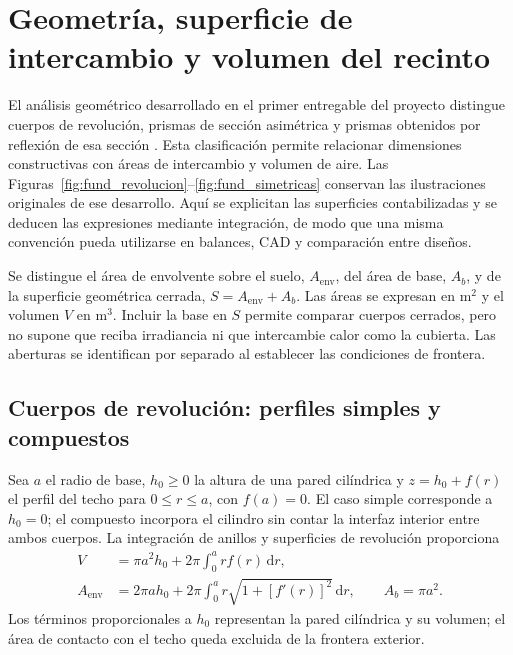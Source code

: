 \section{Geometría, superficie de intercambio y volumen del recinto}
\label{sec:geometria_secadores}

El análisis geométrico desarrollado en el primer entregable del proyecto distingue cuerpos de revolución, prismas de sección asimétrica y prismas obtenidos por reflexión de esa sección \cite{rodriguez2025reporte}. Esta clasificación permite relacionar dimensiones constructivas con áreas de intercambio y volumen de aire. Las Figuras~\ref{fig:fund_revolucion}--\ref{fig:fund_simetricas} conservan las ilustraciones originales de ese desarrollo. Aquí se explicitan las superficies contabilizadas y se deducen las expresiones mediante integración, de modo que una misma convención pueda utilizarse en balances, CAD y comparación entre diseños.

Se distingue el área de envolvente sobre el suelo, $A_{\mathrm{env}}$, del área de base, $A_b$, y de la superficie geométrica cerrada, $S=A_{\mathrm{env}}+A_b$. Las áreas se expresan en $\mathrm{m^2}$ y el volumen $V$ en $\mathrm{m^3}$. Incluir la base en $S$ permite comparar cuerpos cerrados, pero no supone que reciba irradiancia ni que intercambie calor como la cubierta. Las aberturas se identifican por separado al establecer las condiciones de frontera.

\subsection{Cuerpos de revolución: perfiles simples y compuestos}
\label{subsec:geometrias_revolucion}

Sea $a$ el radio de base, $h_0\geq0$ la altura de una pared cilíndrica y $z=h_0+f(r)$ el perfil del techo para $0\leq r\leq a$, con $f(a)=0$. El caso simple corresponde a $h_0=0$; el compuesto incorpora el cilindro sin contar la interfaz interior entre ambos cuerpos. La integración de anillos y superficies de revolución proporciona
\begin{align}
V&=\pi a^2h_0+2\pi\int_0^a r f(r)\,\mathrm dr,
\label{eq:fund_volumen_revolucion}\\
A_{\mathrm{env}}&=2\pi a h_0+2\pi\int_0^a r\sqrt{1+[f'(r)]^2}\,\mathrm dr,
\qquad A_b=\pi a^2.
\label{eq:fund_area_revolucion}
\end{align}
Los términos proporcionales a $h_0$ representan la pared cilíndrica y su volumen; el área de contacto con el techo queda excluida de la frontera exterior.

